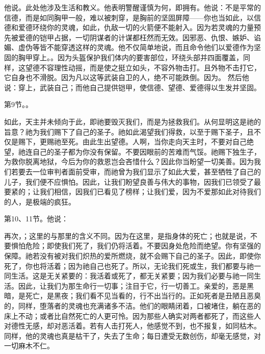 他说。此处他涉及生活和教义。他表明警醒谨慎为何，即拥有。他说：不是平常的信德，而是如同胸甲一般，难以被刺穿，是胸前的坚固屏障——你也当如此，以信德和爱德环绕你的灵魂，如此，仇敌一切的火箭便不能射入。因为若灵魂的力量预先被爱德的铠甲占据，一切阴谋者的计谋都枉然而无效。因邪恶、仇恨、嫉妒、谄媚、虚伪等皆不能穿透这样的灵魂。他不仅简单地说，而且命令他们以爱德作为坚固的胸甲穿上。。因为头盔保护我们体内的要害部位，环绕头部并四面覆盖，同样，这望德不容理性动摇，而是使之挺立如头，不容外物击打。且外物不击打它，它自身也不滑脱。因为凡以这等武装自卫的人，绝不可能跌倒。因为。 然后他说：穿上，武装自己；而他自己提供铠甲，使信德、望德、爱德得以生发并坚固。\par

第9节。。\par

如此，天主并未倾向于此，即祂要毁灭我们，而是为拯救我们。从何显明这是祂的旨意？祂为我们赐下了自己的圣子。祂如此渴望我们得救，以至于赐下圣子，且不仅是赐下，更赐祂至死。由此生出望德。人啊，当你走向天主时，不要对自己绝望，祂连自己的圣子都为你没有保留。不要因眼前的苦难而气馁。祂赐下独生子，为救你脱离地狱，今后为你的救恩岂会吝惜什么？因此你当盼望一切美善。因为我们若要去一位审判者面前受审，而祂曾为我们显示了如此大爱，甚至牺牲了自己的儿子，我们便不应惧怕。因此，让我们盼望良善与伟大的事物，因我们已领受了最要紧的；让我们相信，因我们已看见了榜样；让我们爱，因为不爱那如此对待我们的人，是极端的疯狂。\par

第10、11节。他说：\par

再次，；这里的与那里的含义不同。因为在这里，是指身体的死亡；也就是说，不要惧怕危险；即使我们死了，我们仍将活着。不要因身处危险而绝望。你有坚强的保障。祂若没有被对我们炽热的爱所燃烧，就不会赐下自己的圣子。因此，即使你死了，你也将活着；因为祂自己也死了。所以，无论我们死或生，我们都要与祂一同生活。这是无关紧要的：我活着或死了，都无关紧要；因为我们必要与祂一同生活。因此，让我们为那生命行一切事；注目于它，行一切善工。亲爱的，恶是黑暗，是死亡，是黑夜；我们看不见当看的，行不出当行的。正如死者是丑陋且恶臭的，同样，堕落者的灵魂也充满诸多不洁。他们的眼睛闭着，口被堵住，躺在恶的床上不动；或者比自然死亡的人更可怜。因为那些人确实对两者都死了，而这些人对德性无感，却对恶活着。若有人击打死人，他感觉不到，也不报复，如同枯木。同样，他的灵魂也真是枯干了，失去了生命；每日遭受无数创伤，却毫无感觉，对一切麻木不仁。\par

